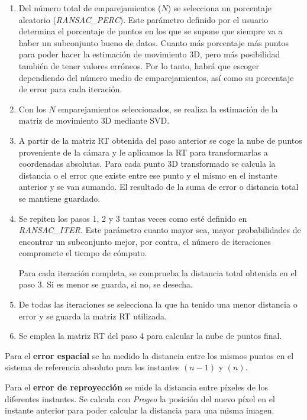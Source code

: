 \begin{enumerate}
\item Del número total de emparejamientos ($N$) se selecciona un porcentaje aleatorio (\textit{RANSAC\_PERC}). Este parámetro definido por el usuario determina el porcentaje de puntos en los que se supone que siempre va a haber un subconjunto bueno de datos. Cuanto más porcentaje más puntos para poder hacer la estimación de movimiento 3D, pero más posibilidad también de tener valores erróneos. Por lo tanto,  habrá que escoger dependiendo del número medio de emparejamientos, así como su porcentaje de error para cada iteración.

\item Con los $N$ emparejamientos seleccionados, se realiza la estimación de la matriz de movimiento 3D mediante SVD.

\item A partir de la matriz RT obtenida del paso anterior se coge la nube de puntos proveniente de la cámara y le aplicamos la RT para transformarlas a coordenadas absolutas. Para cada punto 3D transformado se calcula la distancia o el error que existe entre ese punto y el mismo en el instante anterior y se van sumando. El resultado de la suma de error o distancia total se mantiene guardado.

\item Se repiten los pasos 1, 2 y 3 tantas veces como esté definido en \textit{RANSAC\_ITER}. Este parámetro cuanto mayor sea, mayor probabilidades de encontrar un subconjunto mejor, por contra, el número de iteraciones compromete el tiempo de cómputo.

Para cada iteración completa, se comprueba la distancia total obtenida en el paso 3. Si es menor se guarda, si no, se desecha.
 
\item De todas las iteraciones se selecciona la que ha tenido una menor distancia o error y se guarda la matriz RT utilizada.

\item Se emplea la matriz RT del paso 4 para calcular la nube de puntos final.

\end{enumerate}

Para el \textbf{error espacial} se ha medido la distancia entre los mismos puntos en el sistema de referencia absoluto para los instantes $(n-1)$ y $(n)$. 

Para el \textbf{error de reproyección} se mide la distancia entre píxeles de los diferentes instantes. Se calcula con \textit{Progeo} la posición del nuevo píxel en el instante anterior para poder calcular la distancia para una misma imagen.

